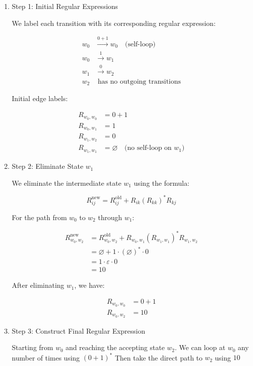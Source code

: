 \documentclass[12pt,a4paper,openany]{article}
\begin{document}
\begin{enumerate}

\item Step 1: Initial Regular Expressions

We label each transition with its corresponding regular expression:

\begin{align*}
w_0 &\xrightarrow{0+1} w_0 \quad \text{(self-loop)} \\
w_0 &\xrightarrow{1} w_1 \\
w_1 &\xrightarrow{0} w_2 \\
w_2 &\text{ has no outgoing transitions}
\end{align*}

Initial edge labels:

\begin{align*}
R_{w_0,w_0} &= 0 + 1 \\
R_{w_0,w_1} &= 1 \\
R_{w_1,w_2} &= 0 \\
R_{w_1,w_1} &= \varnothing \quad \text{(no self-loop on } w_1\text{)}
\end{align*}

\item Step 2: Eliminate State $w_1$

We eliminate the intermediate state $w_1$ using the formula:

\[
R_{ij}^{\text{new}} = R_{ij}^{\text{old}} + R_{ik}(R_{kk})^*R_{kj}
\]

For the path from $w_0$ to $w_2$ through $w_1$:

\[
\begin{aligned}
R_{w_0,w_2}^{\text{new}} &= R_{w_0,w_2}^{\text{old}} + R_{w_0,w_1}(R_{w_1,w_1})^*R_{w_1,w_2} \\
&= \varnothing + 1 \cdot (\varnothing)^* \cdot 0 \\
&= 1 \cdot \varepsilon \cdot 0 \\
&= 10
\end{aligned}
\]

After eliminating $w_1$, we have:

\[
\begin{aligned}
R_{w_0,w_0} &= 0 + 1 \\
R_{w_0,w_2} &= 10
\end{aligned}
\]

\item Step 3: Construct Final Regular Expression

Starting from $w_0$ and reaching the accepting state $w_2$. We can loop at $w_0$ any number of times using $(0+1)^*$
Then take the direct path to $w_2$ using $10$


\end{enumerate}
\end{document}
